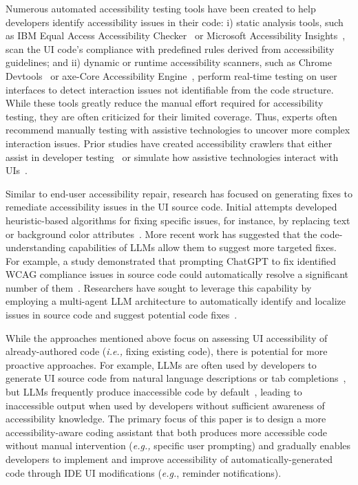 \begin{highlight}
{Numerous automated accessibility testing tools have been created to help developers identify accessibility issues in their code: i) static analysis tools, such as IBM Equal Access Accessibility Checker~\cite{ibm2024toolkit} or Microsoft Accessibility Insights~\cite{accessibilityinsights2024}, scan the UI code's compliance with predefined rules derived from accessibility guidelines; and ii) dynamic or runtime accessibility scanners, such as Chrome Devtools~\cite{chromedevtools2024} or axe-Core Accessibility Engine~\cite{deque2024axe}, perform real-time testing on user interfaces to detect interaction issues not identifiable from the code structure. While these tools greatly reduce the manual effort required for accessibility testing, they are often criticized for their limited coverage. Thus, experts often recommend manually testing with assistive technologies to uncover more complex interaction issues. Prior studies have created accessibility crawlers that either assist in developer testing~\cite{swearngin2024towards,taeb2024axnav} or simulate how assistive technologies interact with UIs~\cite{10.1145/3411764.3445455, 10.1145/3551349.3556905, 10.1145/3544548.3580679}.

Similar to end-user accessibility repair, research has focused on generating fixes to remediate accessibility issues in the UI source code. Initial attempts developed heuristic-based algorithms for fixing specific issues, for instance, by replacing text or background color attributes~\cite{10.1145/3611643.3616329}. More recent work has suggested that the code-understanding capabilities of LLMs allow them to suggest more targeted fixes.
For example, a study demonstrated that prompting ChatGPT to fix identified WCAG compliance issues in source code could automatically resolve a significant number of them~\cite{othman2023fostering}. Researchers have sought to leverage this capability by employing a multi-agent LLM architecture to automatically identify and localize issues in source code and suggest potential code fixes~\cite{mehralian2024automated}.

While the approaches mentioned above focus on assessing UI accessibility of already-authored code (\textit{i.e.,} fixing existing code), there is potential for more proactive approaches.
For example, LLMs are often used by developers to generate UI source code from natural language descriptions or tab completions~\cite{chen2021evaluating,GitHubCopilot,lozhkov2024starcoder,hui2024qwen2,roziere2023code,zheng2023codegeex}, but LLMs frequently produce inaccessible code by default~\cite{10.1145/3677846.3677854,mowar2024tab}, leading to inaccessible output when used by developers without sufficient awareness of accessibility knowledge.
The primary focus of this paper is to design a more accessibility-aware coding assistant that both produces more accessible code without manual intervention (\textit{e.g.,} specific user prompting) and gradually enables developers to implement and improve accessibility of automatically-generated code through IDE UI modifications (\textit{e.g.}, reminder notifications).

}
\end{highlight}



